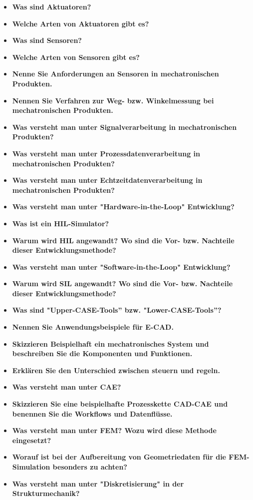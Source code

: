 \documentclass[10pt,a4paper,fleqn]{article}
\begin{document}
\begin{itemize}
	\item \textbf{Was sind Aktuatoren?}
	\item \textbf{Welche Arten von Aktuatoren gibt es?}
	\item \textbf{Was sind Sensoren?}
	\item \textbf{Welche Arten von Sensoren gibt es?}
	\item \textbf{Nenne Sie Anforderungen an Sensoren in mechatronischen Produkten.}
	\item \textbf{Nennen Sie Verfahren zur Weg- bzw. Winkelmessung bei mechatronischen Produkten.}
	\item \textbf{Was versteht man unter Signalverarbeitung in mechatronischen Produkten?}
	\item \textbf{Was versteht man unter Prozessdatenverarbeitung in mechatronischen Produkten?}
	\item \textbf{Was versteht man unter Echtzeitdatenverarbeitung in mechatronischen Produkten?}
	\item \textbf{Was versteht man unter "Hardware-in-the-Loop" Entwicklung?}
	\item \textbf{Was ist ein HIL-Simulator?}
	\item \textbf{Warum wird HIL angewandt? Wo sind die Vor- bzw. Nachteile dieser Entwicklungsmethode?}
	\item \textbf{Was versteht man unter "Software-in-the-Loop" Entwicklung?}
	\item \textbf{Warum wird SIL angewandt? Wo sind die Vor- bzw. Nachteile dieser Entwicklungsmethode?}
	\item \textbf{Was sind "Upper-CASE-Tools” bzw. "Lower-CASE-Tools”?}
	\item \textbf{Nennen Sie Anwendungsbeispiele für E-CAD.}
	\item \textbf{Skizzieren Beispielhaft ein mechatronisches System und beschreiben Sie die Komponenten und Funktionen.}
	\item \textbf{Erklären Sie den Unterschied zwischen steuern und regeln.}
	\item \textbf{Was versteht man unter CAE?}
	\item \textbf{Skizzieren Sie eine beispielhafte Prozesskette CAD-CAE und benennen Sie die Workflows und Datenflüsse.}
	\item \textbf{Was versteht man unter FEM? Wozu wird diese Methode eingesetzt?}
	\item \textbf{Worauf ist bei der Aufbereitung von Geometriedaten für die FEM-Simulation besonders zu achten?}
	\item \textbf{Was versteht man unter "Diskretisierung" in der Strukturmechanik?}
\end{itemize}
\end{document}
